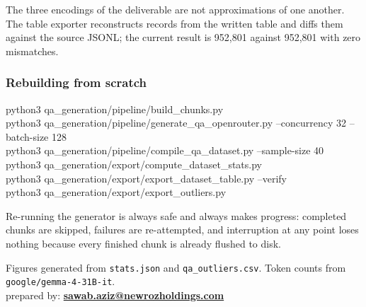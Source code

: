 \documentclass[10pt,a4paper]{article}
\makeatletter
\newcommand{\codeid}[1]{\texttt{\footnotesize\color{inksoft}#1}}
\newcommand{\preparedby}{%
  {\uifont\fontsize{8.5}{11}\selectfont\color{inksoft}%
  prepared by: \href{mailto:sawab.aziz@newrozholdings.com}{%
  \textcolor{bluelink}{\textbf{sawab.aziz@newrozholdings.com}}}}}
\makeatother
\begin{document}
\vspace{0.6em}
The three encodings of the deliverable are not approximations of one another.
The table exporter reconstructs records from the written table and diffs them
against the source JSONL; the current result is 952,801 against 952,801 with
zero mismatches.

\subsubsection{Rebuilding from scratch}

\begin{softcard}
{\footnotesize\ttfamily
python3 qa\_generation/pipeline/build\_chunks.py\\
python3 qa\_generation/pipeline/generate\_qa\_openrouter.py --concurrency 32 --batch-size 128\\
python3 qa\_generation/pipeline/compile\_qa\_dataset.py --sample-size 40\\
python3 qa\_generation/export/compute\_dataset\_stats.py\\
python3 qa\_generation/export/export\_dataset\_table.py --verify\\
python3 qa\_generation/export/export\_outliers.py}
\end{softcard}

Re-running the generator is always safe and always makes progress: completed
chunks are skipped, failures are re-attempted, and interruption at any point
loses nothing because every finished chunk is already flushed to disk.

\vspace{2mm}
\begin{center}
{\uifont\fontsize{7.5}{10}\selectfont\color{inksoft}%
Figures generated from \codeid{stats.json} and \codeid{qa\_outliers.csv}.
Token counts from \codeid{google/gemma-4-31B-it}.}\\[1mm]
\preparedby
\end{center}
\end{document}
